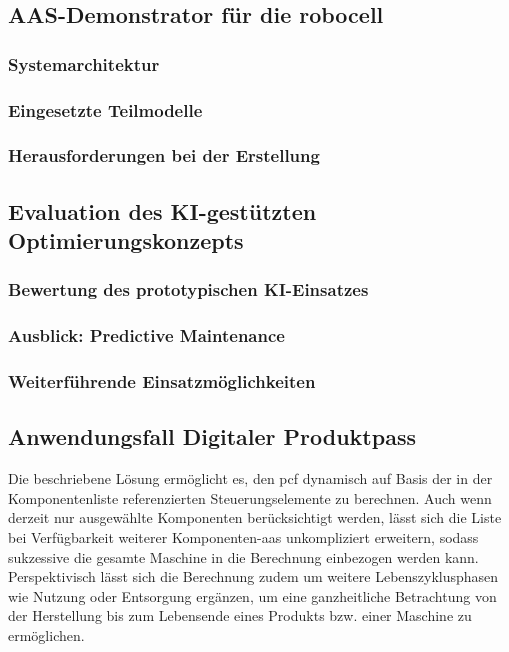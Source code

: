 \subsection{AAS-Demonstrator für die robocell}
\subsubsection{Systemarchitektur}
\subsubsection{Eingesetzte Teilmodelle}
\subsubsection{Herausforderungen bei der Erstellung}
\subsection{Evaluation des KI-gestützten Optimierungskonzepts}
\subsubsection{Bewertung des prototypischen KI-Einsatzes}
\subsubsection{Ausblick: Predictive Maintenance}
\subsubsection{Weiterführende Einsatzmöglichkeiten}
\subsection{Anwendungsfall Digitaler Produktpass}

Die beschriebene Lösung ermöglicht es, den \acs{pcf} dynamisch auf Basis der in der Komponentenliste referenzierten Steuerungselemente zu berechnen. 
Auch wenn derzeit nur ausgewählte Komponenten berücksichtigt werden, lässt sich die Liste bei Verfügbarkeit weiterer Komponenten-\acs{aas} unkompliziert erweitern, sodass sukzessive die gesamte Maschine in die Berechnung einbezogen werden kann. 
Perspektivisch lässt sich die Berechnung zudem um weitere Lebenszyklusphasen wie Nutzung oder Entsorgung ergänzen, um eine ganzheitliche Betrachtung von der Herstellung bis zum Lebensende eines Produkts bzw. einer Maschine zu ermöglichen.


